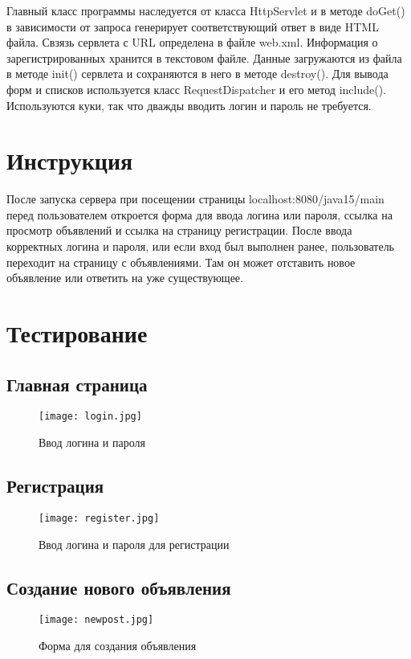 \documentclass{article}
\begin{document}
Главный класс программы наследуется от класса HttpServlet и в методе doGet() в зависимости от запроса генерирует соответствующий ответ в виде HTML файла.
Свзязь сервлета с URL определена в файле web.xml.
Информация о зарегистрированных хранится в текстовом файле. Данные загружаются из файла в методе init() сервлета и сохраняются в него в методе destroy().
Для вывода форм и списков используется класс RequestDispatcher и его метод include(). 
Используются куки, так что дважды вводить логин и пароль не требуется.

\section{Инструкция}
После запуска сервера при посещении страницы localhost:8080/java15/main перед пользователем откроется форма для ввода логина или пароля, ссылка на просмотр объявлений и ссылка на страницу регистрации. После ввода корректных логина и пароля, или если вход был выполнен ранее, пользователь переходит на страницу с объявлениями. Там он может отставить новое объявление или ответить на уже существующее.

\section{Тестирование}

\subsection{Главная страница}
\begin{figure}[H]
	\begin{flushleft}
		\centerline{\texttt{[image: login.jpg]}}
		\caption{Ввод логина и пароля}
	\end{flushleft}
\end{figure}

\subsection{Регистрация}
\begin{figure}[H]
	\begin{flushleft}
		\centerline{\texttt{[image: register.jpg]}}
		\caption{Ввод логина и пароля для регистрации}
	\end{flushleft}
\end{figure}

\subsection{Создание нового объявления}
\begin{figure}[H]
	\begin{flushleft}
		\centerline{\texttt{[image: newpost.jpg]}}
		\caption{Форма для создания объявления}
	\end{flushleft}
\end{figure}
\end{document}
